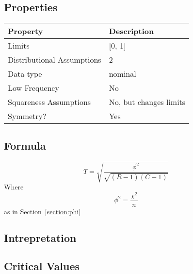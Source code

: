 \documentclass[11pt]{article}
\begin{document}
\subsection{Properties}
\begin{tabular}{| l || l |}
    \hline
    {\bf Property} & {\bf Description} \\
    \hline
    Limits & [0, 1] \\ \hline

    Distributional Assumptions& 2 \\ \hline

    Data type & nominal \\ \hline

    Low Frequency & No \\ \hline

    Squareness Assumptions & No, but changes limits \\ \hline
    
    Symmetry? & Yes \\ \hline

\end{tabular}


\subsection{Formula}
$$
T = \sqrt{ \frac{ \phi^2 }{ \sqrt{ (R-1)(C-1) } } }
$$
Where 
$$
\phi^2 = \frac{\chi^2}{n}
$$
as in Section~\ref{section:phi}

\subsection{Intrepretation}

\subsection{Critical Values}
\end{document}
